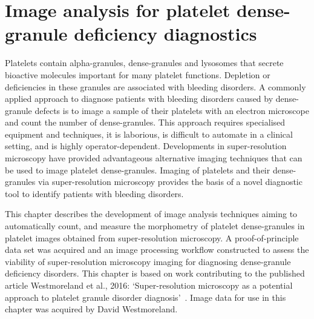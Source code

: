 \chapter{Image analysis for platelet dense-granule deficiency diagnostics}
\label{platelets}
\ifpdf
    \graphicspath{{chapter_3/figs/}}
\fi


Platelets contain alpha-granules, dense-granules and lysosomes that secrete bioactive molecules important for many platelet functions. Depletion or deficiencies in these granules are associated with bleeding disorders. A commonly applied approach to diagnose patients with bleeding disorders caused by dense-granule defects is to image a sample of their platelets with an electron microscope and count the number of dense-granules. This approach requires specialised equipment and techniques, it is laborious, is difficult to automate in a clinical setting, and is highly operator-dependent. Developments in super-resolution microscopy have provided advantageous alternative imaging techniques that can be used to image platelet dense-granules. Imaging of platelets and their dense-granules via super-resolution microscopy provides the basis of a novel diagnostic tool to identify patients with bleeding disorders.

This chapter describes the development of image analysis techniques aiming to automatically count, and measure the morphometry of platelet dense-granules in platelet images obtained from super-resolution microscopy. A proof-of-principle data set was acquired and an image processing workflow constructed to assess the viability of super-resolution microscopy imaging for diagnosing dense-granule deficiency disorders. This chapter is based on work contributing to the published article Westmoreland et al., 2016: `Super-resolution microscopy as a potential approach to platelet granule disorder diagnosis'~\cite{Westmoreland2016}. Image data for use in this chapter was acquired by David Westmoreland.


